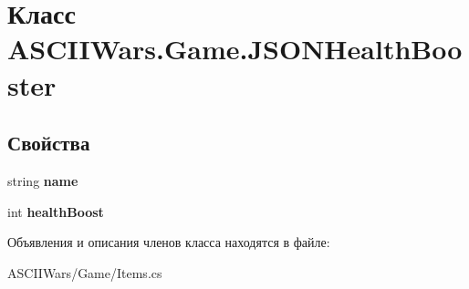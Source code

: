 \hypertarget{class_a_s_c_i_i_wars_1_1_game_1_1_j_s_o_n_health_booster}{}\section{Класс A\+S\+C\+I\+I\+Wars.\+Game.\+J\+S\+O\+N\+Health\+Booster}
\label{class_a_s_c_i_i_wars_1_1_game_1_1_j_s_o_n_health_booster}
\subsection*{Свойства}
\begin{DoxyCompactItemize}
\item 
\hypertarget{class_a_s_c_i_i_wars_1_1_game_1_1_j_s_o_n_health_booster_ab7da845b4a7190d58447278a8d6176c8}{}\label{class_a_s_c_i_i_wars_1_1_game_1_1_j_s_o_n_health_booster_ab7da845b4a7190d58447278a8d6176c8} 
string {\bfseries name}
\item 
\hypertarget{class_a_s_c_i_i_wars_1_1_game_1_1_j_s_o_n_health_booster_a28beed5117608087899c78103f3f8ba4}{}\label{class_a_s_c_i_i_wars_1_1_game_1_1_j_s_o_n_health_booster_a28beed5117608087899c78103f3f8ba4} 
int {\bfseries health\+Boost}
\end{DoxyCompactItemize}


Объявления и описания членов класса находятся в файле\+:\begin{DoxyCompactItemize}
\item 
A\+S\+C\+I\+I\+Wars/\+Game/Items.\+cs\end{DoxyCompactItemize}
